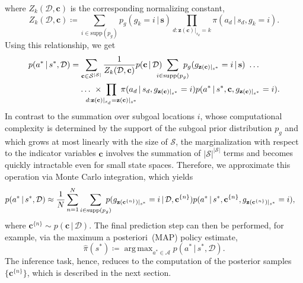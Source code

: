 \documentclass[twoside,11pt]{article}
\newcommand{\p}{p}
\newcommand{\given}{\,\vert\,}
\newcommand{\supp}{\text{supp}}
\newcommand{\softmax}{{\pi}}
\DeclareMathOperator*{\argmax}{arg\,max}
\newcommand{\defeq}{\coloneqq}
\newcommand{\eqkomma}{,}
\newcommand{\eqpunkt}{.}
\begin{document}
where $Z_k(\mathcal{D},\mathbf{c})$ is the corresponding normalizing constant,
\begin{equation}
Z_k(\mathcal{D},\mathbf{c}) \defeq \sum_{i\in\supp(p_g)} \p_g(g_k = i \given \mathbf{s}) \!\!\! \prod_{d:\mathbf{z}(\mathbf{c})\vert_{s_d}=k} \!\!\! \softmax(a_d \given s_d,  g_k = i) \eqpunkt
\label{eq:normalizingConstant}
\end{equation}
Using this relationship, we get
\begin{align*}
	\p(a^* \given s^*,\mathcal{D}) &= \sum_{\mathbf{c}\in\mathcal{S}^{|\mathcal{S}|}} \frac{1}{Z_k(\mathcal{D},\mathbf{c})} \p(\mathbf{c} \given \mathcal{D}) \hspace{-0.3cm} \sum_{i\in\supp(p_g)}^{} \hspace{-0.3cm} \p_g(g_{\mathbf{z}(\mathbf{c})\vert_{s^*}}=i  \given \mathbf{s}) \ \ldots
	\\ &\phantom{=}  \  \ldots \ \times \hspace{-0.75cm} \prod_{d:\mathbf{z}(\mathbf{c})\vert_{s_d}=\mathbf{z}(\mathbf{c})\vert_{s^*}} \hspace{-0.75cm} \softmax(a_d \given s_d, g_{\mathbf{z}(\mathbf{c})\vert_{s^*}}=i) \p(a^* \given s^*,\mathbf{c},g_{\mathbf{z}(\mathbf{c})\vert_{s^*}}=i) \eqpunkt
\end{align*}
In contrast to the summation over %
subgoal locations $i$, whose computational complexity is determined by the support of the subgoal prior distribution $\p_g$ and which grows at most linearly with the size of %
$\mathcal{S}$, the marginalization with respect to the indicator variables $\mathbf{c}$ involves the summation of $|\mathcal{S}|^{|\mathcal{S}|}$ terms and %
becomes quickly intractable even for small state spaces. %
Therefore, we %
approximate this operation via Monte Carlo integration, which yields %
%
%
%
%
\begin{align*}
\p(a^* \given s^*,\mathcal{D}) &\approx \frac{1}{N} \sum_{n=1}^{N} \sum_{i\in\supp(p_g)}^{} \hspace{-0.3cm} \p(g_{\mathbf{z}(\mathbf{c}^{\{n\}})\vert_{s^*}}=i \given \mathcal{D}, \mathbf{c}^{\{n\}})  \p(a^* \given s^*,\mathbf{c}^{\{n\}},g_{\mathbf{z}(\mathbf{c}^{\{n\}})\vert_{s^*}}=i) \eqkomma
\end{align*}
where $\mathbf{c}^{\{n\}} \sim \p(\mathbf{c} \given \mathcal{D})$. 
The final prediction step can then be performed, for example, via the {maximum a posteriori}~(MAP) policy estimate, %
\begin{equation}
	\hat{\pi}(s^*) \defeq \argmax_{a^*\in\mathcal{A}}\p(a^* \given s^*, \mathcal{D}) \eqpunkt
	\label{eq:MAPpolicy}
\end{equation}
The inference task, hence, reduces to the computation of 
%
the posterior samples~$\{\mathbf{c}^{\{n\}}\}$, %
which is described in the next section.
\end{document}
